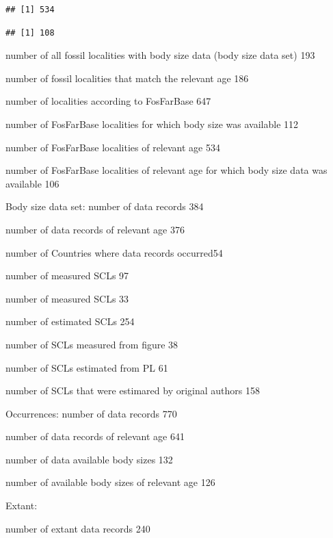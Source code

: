 \documentclass[]{article}
\newenvironment{Shaded}{\begin{snugshade}}{\end{snugshade}}
\newcommand{\KeywordTok}[1]{\textcolor[rgb]{0.13,0.29,0.53}{\textbf{{#1}}}}
\newcommand{\StringTok}[1]{\textcolor[rgb]{0.31,0.60,0.02}{{#1}}}
\newcommand{\NormalTok}[1]{{#1}}
\begin{document}
\begin{verbatim}
## [1] 534
\end{verbatim}

\begin{Shaded}
\end{Shaded}

\begin{verbatim}
## [1] 108
\end{verbatim}

number of all fossil localities with body size data (body size data set)
193

number of fossil localities that match the relevant age 186

number of localities according to FosFarBase 647

number of FosFarBase localities for which body size was available 112

number of FosFarBase localities of relevant age 534

number of FosFarBase localities of relevant age for which body size data
was available 106

Body size data set: number of data records 384

number of data records of relevant age 376

number of Countries where data records occurred54

number of measured SCLs 97

number of measured SCLs 33

number of estimated SCLs 254

number of SCLs measured from figure 38

number of SCLs estimated from PL 61

number of SCLs that were estimared by original authors 158

Occurrences: number of data records 770

number of data records of relevant age 641

number of data available body sizes 132

number of available body sizes of relevant age 126

Extant:

number of extant data records 240
\end{document}
